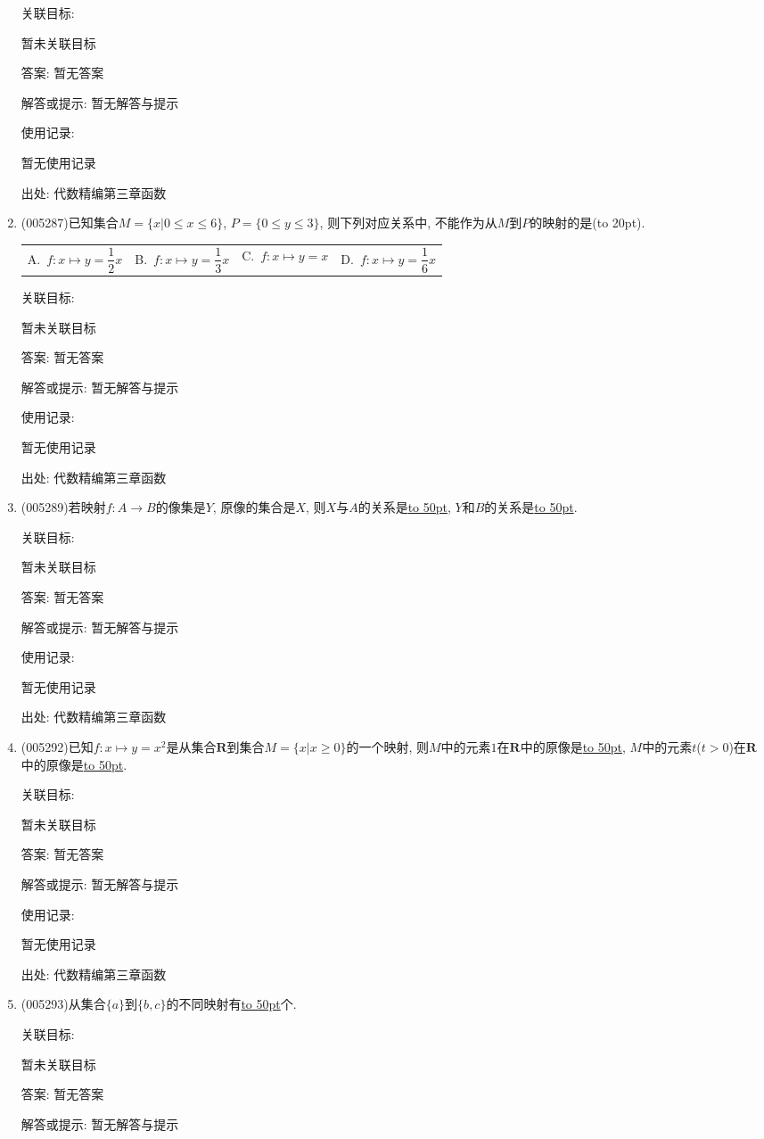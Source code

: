 \documentclass[10pt,a4paper]{article}
\newcommand{\blank}[1]{\underline{\hbox to #1pt{}}}
\newcommand{\bracket}[1]{(\hbox to #1pt{})}
\newcommand{\fourch}[4]{\par\begin{tabular}{p{.23\textwidth}p{.23\textwidth}p{.23\textwidth}p{.23\textwidth}}
A.~#1 &B.~#2& C.~#3& D.~#4
\end{tabular}}
\begin{document}
\begin{enumerate}[1.]
关联目标:

暂未关联目标

答案: 暂无答案

解答或提示: 暂无解答与提示

使用记录:

暂无使用记录


出处: 代数精编第三章函数
\item { (005287)}已知集合$M=\{x|0\le x\le 6\}$, $P=\{0\le y\le 3\}$, 则下列对应关系中, 不能作为从$M$到$P$的映射的是\bracket{20}.
\fourch{$f:x\mapsto y=\dfrac 12x$}{$f:x\mapsto y=\dfrac 13x$}{$f:x\mapsto y=x$}{$f:x\mapsto y=\dfrac 16x$}


关联目标:

暂未关联目标

答案: 暂无答案

解答或提示: 暂无解答与提示

使用记录:

暂无使用记录


出处: 代数精编第三章函数
\item { (005289)}若映射$f:A\to B$的像集是$Y$, 原像的集合是$X$, 则$X$与$A$的关系是\blank{50}, $Y$和$B$的关系是\blank{50}.


关联目标:

暂未关联目标

答案: 暂无答案

解答或提示: 暂无解答与提示

使用记录:

暂无使用记录


出处: 代数精编第三章函数
\item { (005292)}已知$f:x\mapsto y=x^2$是从集合$\mathbf{R}$到集合$M=\{x|x\ge 0\}$的一个映射, 则$M$中的元素$1$在$\mathbf{R}$中的原像是\blank{50}, $M$中的元素$t$($t>0$)在$\mathbf{R}$中的原像是\blank{50}.


关联目标:

暂未关联目标

答案: 暂无答案

解答或提示: 暂无解答与提示

使用记录:

暂无使用记录


出处: 代数精编第三章函数
\item { (005293)}从集合$\{a\}$到$\{b,c\}$的不同映射有\blank{50}个.


关联目标:

暂未关联目标

答案: 暂无答案

解答或提示: 暂无解答与提示


\end{enumerate}
\end{document}
